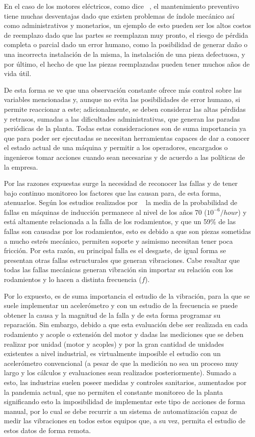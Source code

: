 En el caso de los motores eléctricos, como dice ~\textcite{Lacey}, el
mantenimiento preventivo tiene muchas desventajas dado que existen problemas de
índole mecánico así como administrativos y monetarios, un ejemplo de esto
pueden ser los altos costos de reemplazo dado que las partes se reemplazan muy
pronto, el riesgo de pérdida completa o parcial dado un error humano, como la posibilidad
de generar daño o una incorrecta instalación de la misma, la instalación de una
pieza defectuosa, y por último, el hecho de que las piezas reemplazadas
pueden tener muchos años de vida útil.

De esta forma se ve que una observación constante ofrece más control sobre las
variables mencionadas y, aunque no evita las posibilidades de error humano, si
permite reaccionar a este; adicionalmente, se deben considerar las altas
pérdidas y retrasos, sumadas a las dificultades administrativas, que generan
las paradas periódicas de la planta. Todas estas consideraciones son de suma
importancia ya que para poder ser ejecutadas se necesitan herramientas capaces de
dar a conocer el estado actual de una máquina y permitir a los operadores,
encargados o ingenieros tomar acciones cuando sean necesarias y de acuerdo a
las políticas de la empresa.

Por las razones expuestas surge la necesidad de reconocer las fallas y de tener
bajo continuo monitoreo los factores que las causan para, de esta forma,
atenuarlos. Según los estudios realizados por ~\textcite{Kammermann} la media
de la probabilidad de fallas en máquinas de inducción permanece al nivel de los
años 70 ($10^{-6}/hour$) y está altamente relacionada a la falla de los
rodamientos, y que un 59\% de las fallas son causadas por los rodamientos, esto
es debido a que son piezas sometidas a mucho estrés mecánico, permiten soporte
y asimismo necesitan tener poca fricción. Por esta razón, su principal falla es
el desgaste, de igual forma se presentan otras fallas estructurales que generan
vibraciones. Cabe resaltar que todas las fallas mecánicas generan vibración sin
importar su relación con los rodamientos y lo hacen a distinta frecuencia
($f$).

Por lo expuesto, es de suma importancia el estudio de la vibración, para la que
se suele implementar un acelerómetro y con un estudio de la frecuencia se puede
obtener la causa y la magnitud de la falla y de esta forma programar su
reparación. Sin embargo, debido a que esta evaluación debe ser realizada en
cada rodamiento y acople o extensión del motor  y dadas las mediciones que se
deben realizar por unidad (motor y acoples) y por la gran cantidad de unidades
existentes a nivel industrial, es virtualmente imposible el estudio con un
acelerómetro convencional (a pesar de que la medición no sea un proceso muy
largo y los cálculos y evaluaciones sean realizados posteriormente). Sumado a
esto, las industrias suelen poseer medidas y controles sanitarios, aumentados
por la pandemia actual, que no permiten el constante monitoreo de la planta
significando esto la imposibilidad de implementar este tipo de acciones de
forma manual, por lo cual se debe recurrir a un sistema de automatización capaz
de medir las vibraciones en todos estos equipos que, a su vez, permita el
estudio de estos datos de forma remota.

